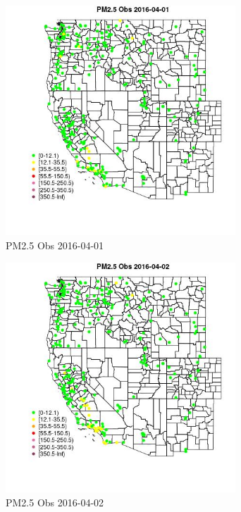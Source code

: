 \begin{figure} 
\centering  
\includegraphics[width=0.77\textwidth]{Code_Outputs/Report_ML_input_PM25_Step4_part_e_de_duplicated_aveswNAs_MapObsPM25_Obs2016-04-01.jpg} 
\caption{\label{fig:Report_ML_input_PM25_Step4_part_e_de_duplicated_aveswNAsMapObsPM25_Obs2016-04-01}PM2.5 Obs 2016-04-01} 
\end{figure} 
 

\begin{figure} 
\centering  
\includegraphics[width=0.77\textwidth]{Code_Outputs/Report_ML_input_PM25_Step4_part_e_de_duplicated_aveswNAs_MapObsPM25_Obs2016-04-02.jpg} 
\caption{\label{fig:Report_ML_input_PM25_Step4_part_e_de_duplicated_aveswNAsMapObsPM25_Obs2016-04-02}PM2.5 Obs 2016-04-02} 
\end{figure} 
 

